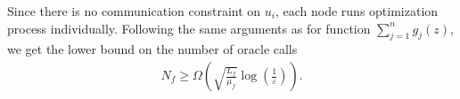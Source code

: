 \documentclass{article}
\newcommand{\R}{\mathbb{R}}
\newcommand{\mA}{\mathbf{A}}
\newcommand{\mW}{\mathbf{W}}
\newcommand{\angles}[1]{\left\langle #1 \right\rangle}
\newcommand{\cbraces}[1]{\left( #1 \right)}
\newcommand{\sbraces}[1]{\left[ #1 \right]}
\newcommand{\eps}{\varepsilon}
\begin{document}
Since there is no communication constraint on $u_i$, each node runs optimization process individually. Following the same arguments as for function $\sum_{j=1}^n g_j(z)$, we get the lower bound on the number of oracle calls
\begin{align*}
	N_f\geq \Omega\cbraces{\sqrt{\frac{L_f}{\mu_f}} \log\cbraces{\frac{1}{\eps}}}.
\end{align*}

%

\end{document}
